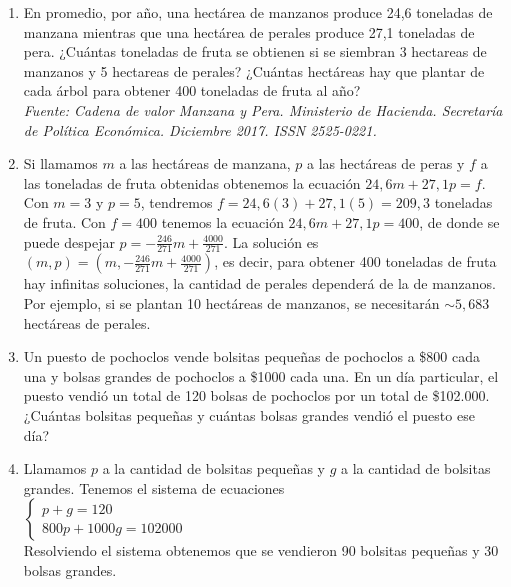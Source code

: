 \documentclass[a4paper]{article}
\newcommand{\answer}{\item[**]}
\begin{document}
\begin{enumerate}
\begin{enumerate} [label=(\alph*)]
		\item En promedio, por año, una hectárea de manzanos produce 24,6 toneladas de manzana mientras que una hectárea de perales produce 27,1 toneladas de pera. ¿Cuántas toneladas de fruta se obtienen si se siembran 3 hectareas de manzanos y 5 hectareas de perales? ¿Cuántas hectáreas hay que plantar de cada árbol para obtener 400 toneladas de fruta al año? \\ \textit{Fuente: Cadena de valor Manzana y Pera. Ministerio de Hacienda. Secretaría de Política Económica. Diciembre 2017. ISSN 2525-0221.}
		\answer Si llamamos $m$ a las hectáreas de manzana, $p$ a las hectáreas de peras y $f$ a las toneladas de fruta obtenidas obtenemos la ecuación $24,6 m + 27,1 p = f$. Con $m=3$ y $p=5$, tendremos $f=24,6 (3)+27,1(5)=209,3$ toneladas de fruta. Con $f=400$ tenemos la ecuación $24,6 m + 27,1 p = 400$, de donde se puede despejar $p=-\frac{246}{271}m+\frac{4000}{271}$. La solución es $(m,p)=\left(m,-\frac{246}{271}m+\frac{4000}{271}\right)$, es decir, para obtener 400 toneladas de fruta hay infinitas soluciones, la cantidad de perales dependerá de la de manzanos. Por ejemplo, si se plantan 10 hectáreas de manzanos, se necesitarán $\sim5,683$ hectáreas de perales.

		\item Un puesto de pochoclos vende bolsitas pequeñas de pochoclos a \$800 cada una y bolsas grandes de pochoclos a \$1000 cada una. En un día particular, el puesto vendió un total de 120 bolsas de pochoclos por un total de \$102.000. ¿Cuántas bolsitas pequeñas y cuántas bolsas grandes vendió el puesto ese día?
		\answer Llamamos $p$ a la cantidad de bolsitas pequeñas y $g$ a la cantidad de bolsitas grandes. Tenemos el sistema de ecuaciones \\ \vspace{2mm} $\left\{\begin{matrix} p+g=120 \\ 800p+1000g=102000 \end{matrix}\right.$ \\ Resolviendo el sistema obtenemos que se vendieron 90 bolsitas pequeñas y 30 bolsas grandes.


\end{enumerate}
\end{enumerate}
\end{document}
